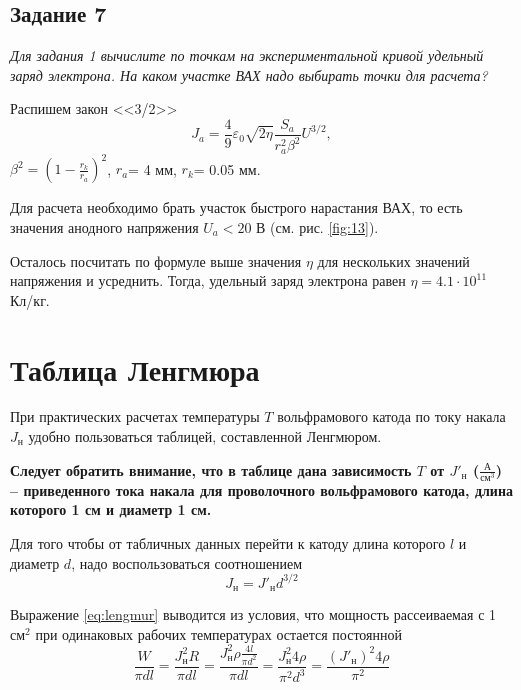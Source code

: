 \subsection{Задание 7}
 \textit{Для задания 1 вычислите по точкам на экспериментальной кривой удельный
 заряд электрона. На каком участке ВАХ надо выбирать точки для расчета?}

 Распишем закон <<3/2>>
\begin{equation}
J_a=\frac49 \varepsilon_0 \sqrt{2 \eta} \frac{S_a}{r_a^2 \beta^2} U^{3/2}, 
\end{equation}
$\beta^2=(1-\frac{r_k}{r_a})^2$, $r_a$= 4 мм, $r_k$= 0.05 мм. 

Для расчета необходимо брать участок быстрого нарастания ВАХ, то есть значения
анодного напряжения $U_a < 20$ В (см. рис. \ref{fig:13}). 

Осталось посчитать по формуле выше значения $\eta$ для нескольких значений
напряжения и усреднить. 
Тогда, удельный заряд электрона равен $\eta=4.1 \cdot 10^{11}$ Кл/кг.


\appendix

\section{Таблица Ленгмюра}%
\label{sub:tablitsa_lengmiura}
При практических расчетах температуры $T$ вольфрамового катода по току накала
$J_{\text{н}}$  удобно пользоваться таблицей, составленной Ленгмюром.

\textbf{
    Следует обратить внимание, что в таблице дана зависимость  $T$ от
    $J'_{\text{н}}$  ($\frac{\text{А}}{\text{см}^3}$) -- приведенного тока
    накала для проволочного вольфрамового катода, длина которого 1 см и диаметр
    1 см. 
} 

Для того чтобы от табличных данных перейти к катоду длина которого $l$ и
диаметр $d$, надо воспользоваться соотношением
\begin{equation}
    \label{eq:lengmur}
    J_{\text{н}} = J'_{\text{н}} d^{3 / 2}
\end{equation}

Выражение \eqref{eq:lengmur} выводится из условия, что мощность рассеиваемая с
1 $\text{см}^2$ при одинаковых рабочих температурах остается постоянной
 \begin{equation}
     \frac{W}{\pi d l} = \frac{J_{\text{н}}^2 R}{\pi d l} = \frac{J^2_{\text{н}}
     \rho \frac{4l}{\pi d^2}}{\pi d l} = \frac{J^2_{\text{н}} 4 \rho}{\pi^2
 d^3} = \frac{(J'_{\text{н}})^2 4 \rho}{\pi^2}
\end{equation}


